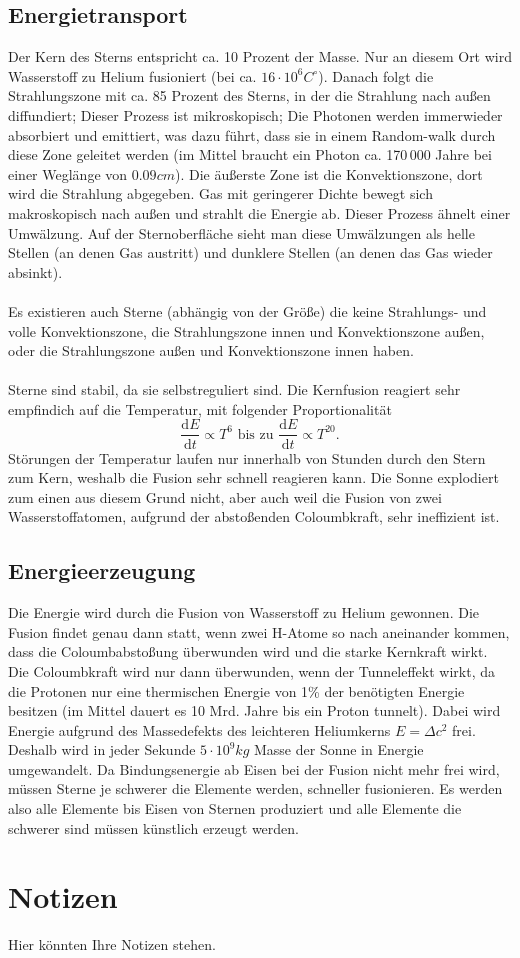 \documentclass[a4paper,12pt]{article}
\begin{document}
\subsection{Energietransport}
Der Kern des Sterns entspricht ca. 10 Prozent der Masse. Nur an diesem Ort wird Wasserstoff zu Helium fusioniert (bei ca. $16\cdot 10^6C^\circ$). Danach folgt die Strahlungszone mit ca. 85 Prozent des Sterns, in der die Strahlung nach außen diffundiert; Dieser Prozess ist mikroskopisch; Die Photonen werden immerwieder absorbiert und emittiert, was dazu führt, dass sie in einem \glqq Random-walk\grqq{} durch diese Zone geleitet werden (im Mittel braucht ein Photon ca. 170\,000 Jahre bei einer Weglänge von $0.09cm$). Die äußerste Zone ist die Konvektionszone, dort wird die Strahlung abgegeben. Gas mit geringerer Dichte bewegt sich makroskopisch nach außen und strahlt die Energie ab. Dieser Prozess ähnelt einer Umwälzung. Auf der Sternoberfläche sieht man diese Umwälzungen als helle Stellen (an denen Gas austritt) und dunklere Stellen (an denen das Gas wieder absinkt).\\\\
Es existieren auch Sterne (abhängig von der Größe) die keine Strahlungs- und volle Konvektionszone, die Strahlungszone innen und Konvektionszone außen, oder die Strahlungszone außen und Konvektionszone innen haben.\\\\
Sterne sind stabil, da sie selbstreguliert sind. Die Kernfusion reagiert sehr empfindich auf die Temperatur, mit folgender Proportionalität
\[ 
        \dfrac{\text{d}E}{\text{d}t}\propto T^6\text{ bis zu }\dfrac{\text{d}E}{\text{d}t}\propto T^{20}
.\] 
\glqq Störungen\grqq{} der Temperatur laufen nur innerhalb von Stunden durch den Stern zum Kern, weshalb die Fusion sehr schnell reagieren kann. Die Sonne explodiert zum einen aus diesem Grund nicht, aber auch weil die Fusion von zwei Wasserstoffatomen, aufgrund der abstoßenden Coloumbkraft, sehr ineffizient ist.

\subsection{Energieerzeugung}
Die Energie wird durch die Fusion von Wasserstoff zu Helium gewonnen. Die Fusion findet genau dann statt, wenn zwei H-Atome so nach aneinander kommen, dass die Coloumbabstoßung überwunden wird und die starke Kernkraft wirkt. Die Coloumbkraft wird nur dann überwunden, wenn der Tunneleffekt wirkt, da die Protonen nur eine thermischen Energie von 1\% der benötigten Energie besitzen (im Mittel dauert es 10 Mrd. Jahre bis ein Proton tunnelt). Dabei wird Energie aufgrund des Massedefekts des leichteren Heliumkerns $E=\Delta c ^2$ frei. Deshalb wird in jeder Sekunde $5\cdot 10^{9}kg$ Masse der Sonne in Energie umgewandelt. Da Bindungsenergie ab Eisen bei der Fusion nicht mehr frei wird, müssen Sterne je schwerer die Elemente werden, schneller fusionieren. Es werden also alle Elemente bis Eisen von Sternen produziert und alle Elemente die schwerer sind müssen künstlich erzeugt werden.


\section{Notizen}
Hier könnten Ihre Notizen stehen.

\end{document}

